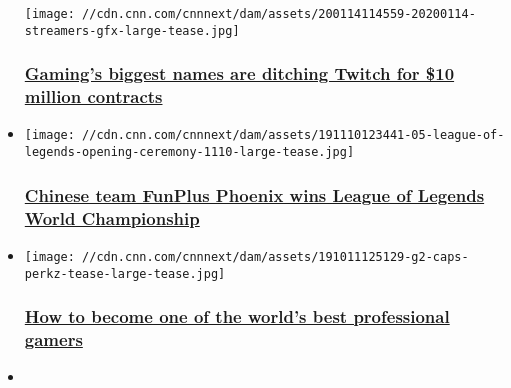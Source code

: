 \begin{itemize}
  \texttt{[image: //cdn.cnn.com/cnnnext/dam/assets/200114114559-20200114-streamers-gfx-large-tease.jpg]}

  \hypertarget{gamings-biggest-names-are-ditching-twitch-for-10-million-contracts-}{%
  \subsubsection{\texorpdfstring{\href{/2020/01/26/tech/video-game-streaming-wars/index.html}{Gaming's
  biggest names are ditching Twitch for \$10 million contracts
  }}{Gaming's biggest names are ditching Twitch for \$10 million contracts }}\label{gamings-biggest-names-are-ditching-twitch-for-10-million-contracts-}}
\item
  \href{/2019/11/10/tech/league-world-paris-opening/index.html}{}

  \texttt{[image: //cdn.cnn.com/cnnnext/dam/assets/191110123441-05-league-of-legends-opening-ceremony-1110-large-tease.jpg]}

  \hypertarget{chinese-team-funplus-phoenix-wins-league-of-legends-world-championship-}{%
  \subsubsection{\texorpdfstring{\href{/2019/11/10/tech/league-world-paris-opening/index.html}{Chinese
  team FunPlus Phoenix wins League of Legends World Championship
  }}{Chinese team FunPlus Phoenix wins League of Legends World Championship }}\label{chinese-team-funplus-phoenix-wins-league-of-legends-world-championship-}}
\item
  \href{/2019/10/12/sport/esports-g2-league-of-legends-perkz-caps-worlds-spt-intl/index.html}{}

  \texttt{[image: //cdn.cnn.com/cnnnext/dam/assets/191011125129-g2-caps-perkz-tease-large-tease.jpg]}

  \hypertarget{how-to-become-one-of-the-worlds-best-professional-gamers-}{%
  \subsubsection{\texorpdfstring{\href{/2019/10/12/sport/esports-g2-league-of-legends-perkz-caps-worlds-spt-intl/index.html}{How
  to become one of the world's best professional gamers
  }}{How to become one of the world's best professional gamers }}\label{how-to-become-one-of-the-worlds-best-professional-gamers-}}
\item
  \href{/2019/10/16/tech/blizzard-hong-kong-american-students-ban/index.html}{}


\end{itemize}
